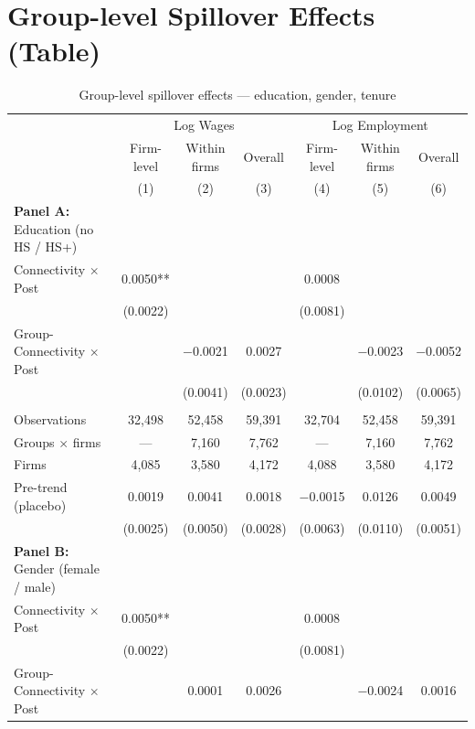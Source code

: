 \documentclass[11pt]{article}
\begin{document}
\section{Group-level Spillover Effects (Table)}
\begin{table}[H]
\centering
\caption{Group-level spillover effects --- education, gender, tenure}
\scriptsize
\begin{tabular}{lcccccc}
\toprule\toprule
 & \multicolumn{3}{c}{Log Wages} & \multicolumn{3}{c}{Log Employment} \\
\cmidrule(lr){2-4} \cmidrule(lr){5-7}
 & \shortstack{Firm-\\level} & \shortstack{Within\\firms} & Overall
 & \shortstack{Firm-\\level} & \shortstack{Within\\firms} & Overall \\
 & (1) & (2) & (3) & (4) & (5) & (6) \\
\midrule
\textbf{Panel A:} Education (no HS / HS+) &  &  &  &  &  &  \\
Connectivity $\times$ Post & 0.0050** &  &  & 0.0008 &  &  \\
 & (0.0022) &  &  & (0.0081) &  &  \\
Group-Connectivity $\times$ Post &  & $-$0.0021 & 0.0027 &  & $-$0.0023 & $-$0.0052 \\
 &  & (0.0041) & (0.0023) &  & (0.0102) & (0.0065) \\
 &  &  &  &  &  &  \\
Observations & 32{,}498 & 52{,}458 & 59{,}391 & 32{,}704 & 52{,}458 & 59{,}391 \\
Groups $\times$ firms & --- & 7{,}160 & 7{,}762 & --- & 7{,}160 & 7{,}762 \\
Firms & 4{,}085 & 3{,}580 & 4{,}172 & 4{,}088 & 3{,}580 & 4{,}172 \\
Pre-trend (placebo) & 0.0019 & 0.0041 & 0.0018 & $-$0.0015 & 0.0126 & 0.0049 \\
 & (0.0025) & (0.0050) & (0.0028) & (0.0063) & (0.0110) & (0.0051) \\
\midrule
\textbf{Panel B:} Gender (female / male) &  &  &  &  &  &  \\
Connectivity $\times$ Post & 0.0050** &  &  & 0.0008 &  &  \\
 & (0.0022) &  &  & (0.0081) &  &  \\
Group-Connectivity $\times$ Post &  & 0.0001 & 0.0026 &  & $-$0.0024 & 0.0016 \\

\end{tabular}
\end{table}
\end{document}
